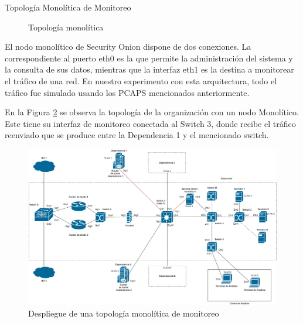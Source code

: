 \begin{subsection}{Topología Monolítica de Monitoreo}
\begin{figure}[H]
                \caption{Topología monolítica}
                \label{fig:figura_33_a}
            \end{figure}
            El nodo monolítico de Security Onion dispone de dos conexiones. La correspondiente al puerto eth0 es la que permite la administración del sistema y la consulta de sus datos, mientras que la interfaz eth1 es la destina a monitorear el tráfico de una red. En nuestro experimento con esta arquitectura, todo el tráfico fue simulado usando los PCAPS mencionados anteriormente. \par
            En la Figura \ref{fig:iter1_top_m_unc} se observa la topología de la organización con un nodo Monolítico. Este tiene su interfaz de monitoreo conectada al Switch 3, donde recibe el tráfico reenviado que se produce entre la Dependencia 1 y el mencionado switch.
            \begin{figure}[H]
                \centering
                \includegraphics[width=1\textwidth]{./iteracion_1_imagenes/figura_topologia_m_unc.png}
                \caption{Despliegue de una topología monolítica de monitoreo}
                \label{fig:iter1_top_m_unc}
            \end{figure}
        \end{subsection}
        
